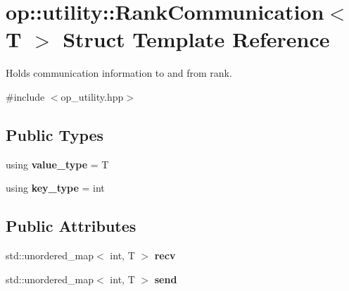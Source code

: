 \hypertarget{structop_1_1utility_1_1RankCommunication}{\section{op\-:\-:utility\-:\-:Rank\-Communication$<$ T $>$ Struct Template Reference}
\label{structop_1_1utility_1_1RankCommunication}
}


Holds communication information to and from rank.  




{\ttfamily \#include $<$op\-\_\-utility.\-hpp$>$}

\subsection*{Public Types}
\begin{DoxyCompactItemize}
\item 
\hypertarget{structop_1_1utility_1_1RankCommunication_ac666b7c8853fb4ddae567e3f02b11812}{using {\bfseries value\-\_\-type} = T}\label{structop_1_1utility_1_1RankCommunication_ac666b7c8853fb4ddae567e3f02b11812}

\item 
\hypertarget{structop_1_1utility_1_1RankCommunication_a4eabbd32df0d34c84fc7f20f4f50029e}{using {\bfseries key\-\_\-type} = int}\label{structop_1_1utility_1_1RankCommunication_a4eabbd32df0d34c84fc7f20f4f50029e}

\end{DoxyCompactItemize}
\subsection*{Public Attributes}
\begin{DoxyCompactItemize}
\item 
\hypertarget{structop_1_1utility_1_1RankCommunication_a381599dde9ebbcb9beae742d287e4977}{std\-::unordered\-\_\-map$<$ int, T $>$ {\bfseries recv}}\label{structop_1_1utility_1_1RankCommunication_a381599dde9ebbcb9beae742d287e4977}

\item 
\hypertarget{structop_1_1utility_1_1RankCommunication_a9108f92d0dda9d382d5b91a14ac7fea8}{std\-::unordered\-\_\-map$<$ int, T $>$ {\bfseries send}}\label{structop_1_1utility_1_1RankCommunication_a9108f92d0dda9d382d5b91a14ac7fea8}

\end{DoxyCompactItemize}


